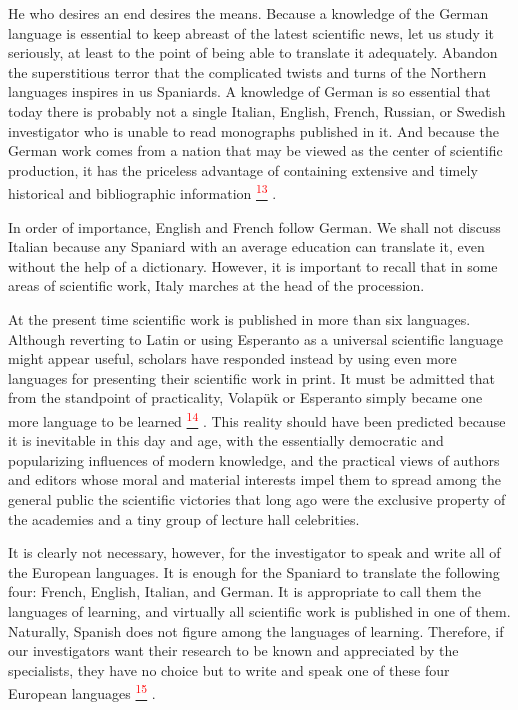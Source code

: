 \documentclass{article}
\newcommand{\noteref}[1]{%
 \hypertarget{ref:#1}{}%
 \hyperlink{note:#1}{\textsuperscript{\textcolor{red}{#1}}}%
}
\begin{document}
He who desires an end desires the means. Because a knowledge of the German language is essential to keep abreast of the latest scientific news, let us study it seriously, at least to the point of being able to translate it adequately. Abandon the superstitious terror that the complicated twists and turns of the Northern languages inspires in us Spaniards. A knowledge of German is so essential that today there is probably not a single Italian, English, French, Russian, or Swedish investigator who is unable to read monographs published in it. And because the German work comes from a nation that may be viewed as the center of scientific production, it has the priceless advantage of containing extensive and timely historical and bibliographic information\noteref{13}.

In order of importance, English and French follow German. We shall not discuss Italian because any Spaniard with an average education can translate it, even without the help of a dictionary. However, it is important to recall that in some areas of scientific work, Italy marches at the head of the procession.

At the present time scientific work is published in more than six languages. Although reverting to Latin or using Esperanto as a universal scientific language might appear useful, scholars have responded instead by using even more languages for presenting their scientific work in print. It must be admitted that from the standpoint of practicality, Volapük or Esperanto simply became one more language to be learned\noteref{14}. This reality should have been predicted because it is inevitable in this day and age, with the essentially democratic and popularizing influences of modern knowledge, and the practical views of authors and editors whose moral and material interests impel them to spread among the general public the scientific victories that long ago were the exclusive property of the academies and a tiny group of lecture hall celebrities.

It is clearly not necessary, however, for the investigator to speak and write all of the European languages. It is enough for the Spaniard to translate the following four: French, English, Italian, and German. It is appropriate to call them the languages of learning, and virtually all scientific work is published in one of them. Naturally, Spanish does not figure among the languages of learning. Therefore, if our investigators want their research to be known and appreciated by the specialists, they have no choice but to write and speak one of these four European languages\noteref{15}.
\end{document}
